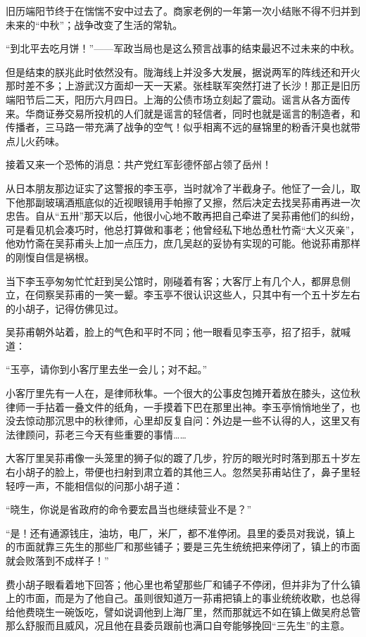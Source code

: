 \par 旧历端阳节终于在惴惴不安中过去了。商家老例的一年第一次小结账不得不归并到未来的“中秋”；战争改变了生活的常轨。
\par “到北平去吃月饼！”——军政当局也是这么预言战事的结束最迟不过未来的中秋。
\par 但是结束的朕兆此时依然没有。陇海线上并没多大发展，据说两军的阵线还和开火那时差不多；上游武汉方面却一天一天紧。张桂联军突然打进了长沙！那正是旧历端阳节后二天，阳历六月四日。上海的公债市场立刻起了震动。谣言从各方面传来。华商证券交易所投机的人们就是谣言的轻信者，同时也就是谣言的制造者，和传播者，三马路一带充满了战争的空气！似乎相离不远的昼锦里的粉香汗臭也就带点儿火药味。
\par 接着又来一个恐怖的消息：共产党红军彭德怀部占领了岳州！
\par 从日本朋友那边证实了这警报的李玉亭，当时就冷了半截身子。他怔了一会儿，取下他那副玻璃酒瓶底似的近视眼镜用手帕擦了又擦，然后决定去找吴荪甫再进一次忠告。自从“五卅”那天以后，他很小心地不敢再把自己牵进了吴荪甫他们的纠纷，可是看见机会凑巧时，他总打算做和事老；他曾经私下地怂恿杜竹斋“大义灭亲”，他劝竹斋在吴荪甫头上加一点压力，庶几吴赵的妥协有实现的可能。他说荪甫那样的刚愎自信是祸根。
\par 当下李玉亭匆匆忙忙赶到吴公馆时，刚碰着有客；大客厅上有几个人，都屏息侧立，在伺察吴荪甫的一笑一颦。李玉亭不很认识这些人，只其中有一个五十岁左右的小胡子，记得仿佛见过。
\par 吴荪甫朝外站着，脸上的气色和平时不同；他一眼看见李玉亭，招了招手，就喊道：
\par “玉亭，请你到小客厅里去坐一会儿；对不起。”
\par 小客厅里先有一人在，是律师秋隼。一个很大的公事皮包摊开着放在膝头，这位秋律师一手拈着一叠文件的纸角，一手摸着下巴在那里出神。李玉亭悄悄地坐了，也没去惊动那沉思中的秋律师，心里却反复自问：外边是一些不认得的人，这里又有法律顾问，荪老三今天有些重要的事情……
\par 大客厅里吴荪甫像一头笼里的狮子似的踱了几步，狞厉的眼光时时落到那五十岁左右小胡子的脸上，带便也扫射到肃立着的其他三人。忽然吴荪甫站住了，鼻子里轻轻哼一声，不能相信似的问那小胡子道：
\par “晓生，你说是省政府的命令要宏昌当也继续营业不是？”
\par “是！还有通源钱庄，油坊，电厂，米厂，都不准停闭。县里的委员对我说，镇上的市面就靠三先生的那些厂和那些铺子；要是三先生统统把来停闭了，镇上的市面就会败落到不成样子！”
\par 费小胡子眼看着地下回答；他心里也希望那些厂和铺子不停闭，但并非为了什么镇上的市面，而是为了他自己。虽则很知道万一荪甫把镇上的事业统统收歇，也总得给他费晓生一碗饭吃，譬如说调他到上海厂里，然而那就远不如在镇上做吴府总管那么舒服而且威风，况且他在县委员跟前也满口自夸能够挽回“三先生”的主意。

